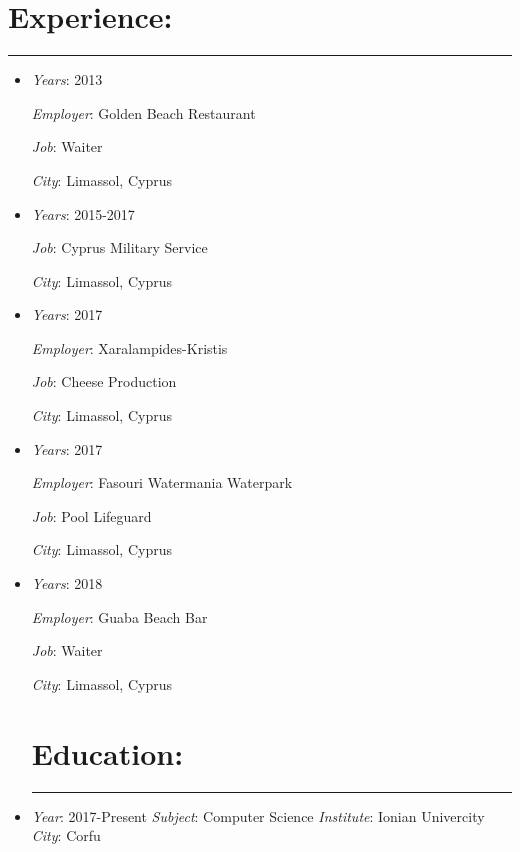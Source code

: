 \documentclass{article}
\begin{document}
\section{\huge Experience:}
\noindent
{\color{black} \rule{\linewidth}{2mm} }
\begin{itemize}
\item \textit{\large Years}: 2013

  \textit{\large Employer}: Golden Beach Restaurant

  \textit{\large Job}: Waiter

  \textit{\large City}: Limassol, Cyprus
\item \textit{\large Years}: 2015-2017

  \textit{\large Job}: Cyprus Military Service

  \textit{\large City}: Limassol, Cyprus
\item \textit{\large Years}: 2017

  \textit{\large Employer}: Xaralampides-Kristis

  \textit{\large Job}: Cheese Production

  \textit{\large City}: Limassol, Cyprus
\item \textit{\large Years}: 2017

  \textit{\large Employer}: Fasouri Watermania Waterpark

  \textit{\large Job}: Pool Lifeguard

  \textit{\large City}: Limassol, Cyprus
\item \textit{\large Years}: 2018

  \textit{\large Employer}: Guaba Beach Bar

  \textit{\large Job}: Waiter

  \textit{\large City}: Limassol, Cyprus
  \section{\huge Education:}
\noindent
{\color{black} \rule{\linewidth}{2mm} }  \end{itemize}
\begin{itemize}
\item  \textit{\large Year}: 2017-Present\newline
  \textit{\large Subject}: Computer Science\newline
  \textit{\large Institute}: Ionian Univercity\newline
  \textit{\large City}: Corfu
\end{itemize}
\end{document}
